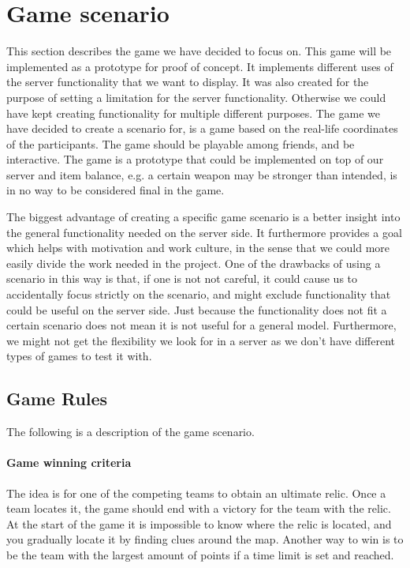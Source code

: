 \section{Game scenario}\label{sec:game}

This section describes the game we have decided to focus on. This game will be implemented as a prototype for proof of concept. It implements different uses of the server functionality that we want to display. It was also created for the purpose of setting a limitation for the server functionality. Otherwise we could have kept creating functionality for multiple different purposes. The game we have decided to create a scenario for, is a game based on the real-life coordinates of the participants. The game should be playable among friends, and be interactive. The game is a prototype that could be implemented on top of our server and item balance, e.g. a certain weapon may be stronger than intended, is in no way to be considered final in the game.

The biggest advantage of creating a specific game scenario is a better insight into the general functionality needed on the server side. It furthermore provides a goal which helps with motivation and work culture, in the sense that we could more easily divide the work needed in the project. One of the drawbacks of using a scenario in this way is that, if one is not not careful, it could cause us to accidentally focus strictly on the scenario, and might exclude functionality that could be useful on the server side. Just because the functionality does not fit a certain scenario does not mean it is not useful for a general model. Furthermore, we might not get the flexibility we look for in a server as we don't have different types of games to test it with.

\subsection{Game Rules}\label{subsec:game-rules}

The following is a description of the game scenario.

\paragraph{Game winning criteria}
The idea is for one of the competing teams to obtain an ultimate relic. Once a team locates it, the game should end with a victory for the team with the relic. At the start of the game it is impossible to know where the relic is located, and you gradually locate it by finding clues around the map.
Another way to win is to be the team with the largest amount of points if a time limit is set and reached.

